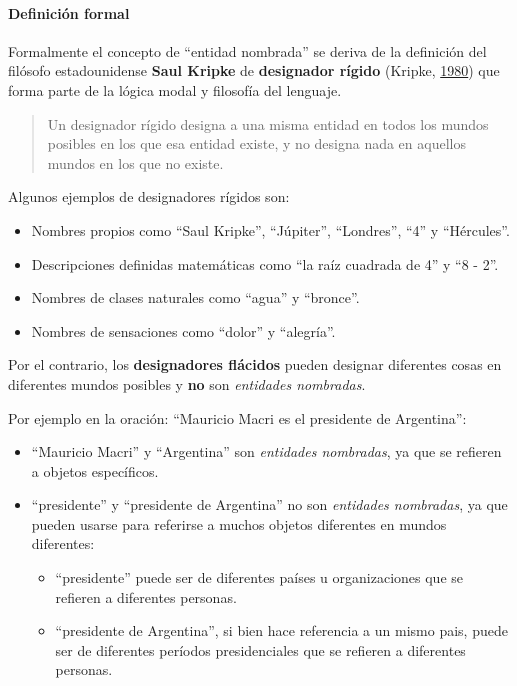 \documentclass[12pt,a4paper,]{scrartcl}
\providecommand{\tightlist}{%
  \setlength{\itemsep}{0pt}\setlength{\parskip}{0pt}}
\let\oldparagraph\paragraph
\renewcommand{\paragraph}[1]{\oldparagraph{#1}\mbox{}}
\begin{document}
\hypertarget{ner-formal}{%
\paragraph{Definición formal}\label{ner-formal}}

Formalmente el concepto de \enquote{entidad nombrada} se deriva de la definición del filósofo estadounidense \textbf{Saul Kripke} de \textbf{designador rígido} (Kripke, \protect\hyperlink{ref-kripke1980naming}{1980}) que forma parte de la lógica modal y filosofía del lenguaje.

\begin{quote}
Un designador rígido designa a una misma entidad en todos los mundos posibles en los que esa entidad existe, y no designa nada en aquellos mundos en los que no existe.
\end{quote}

Algunos ejemplos de designadores rígidos son:

\begin{itemize}
\tightlist
\item
  Nombres propios como \enquote{Saul Kripke}, \enquote{Júpiter}, \enquote{Londres}, \enquote{4} y \enquote{Hércules}.
\item
  Descripciones definidas matemáticas como \enquote{la raíz cuadrada de 4} y \enquote{8 - 2}.
\item
  Nombres de clases naturales como \enquote{agua} y \enquote{bronce}.
\item
  Nombres de sensaciones como \enquote{dolor} y \enquote{alegría}.
\end{itemize}

Por el contrario, los \textbf{designadores flácidos} pueden designar diferentes cosas en diferentes mundos posibles y \textbf{no} son \emph{entidades nombradas}.

Por ejemplo en la oración: \enquote{Mauricio Macri es el presidente de Argentina}:

\begin{itemize}
\tightlist
\item
  \enquote{Mauricio Macri} y \enquote{Argentina} son \emph{entidades nombradas}, ya que se refieren a objetos específicos.
\item
  \enquote{presidente} y \enquote{presidente de Argentina} no son \emph{entidades nombradas}, ya que pueden usarse para referirse a muchos objetos diferentes en mundos diferentes:

  \begin{itemize}
  \tightlist
  \item
    \enquote{presidente} puede ser de diferentes países u organizaciones que se refieren a diferentes personas.
  \item
    \enquote{presidente de Argentina}, si bien hace referencia a un mismo pais, puede ser de diferentes períodos presidenciales que se refieren a diferentes personas.
  \end{itemize}
\end{itemize}
\end{document}
